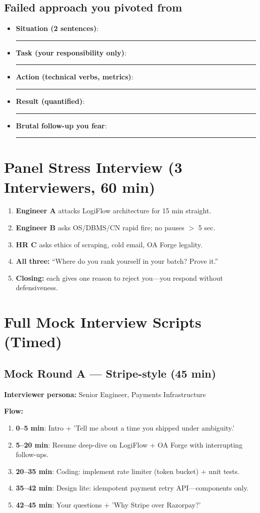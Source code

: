 \documentclass[9pt,a4paper]{article}
\begin{document}
\subsection{Failed approach you pivoted from}
\begin{itemize}
  \item \textbf{Situation (2 sentences)}: \rule{0.65\textwidth}{0.4pt}
  \item \textbf{Task (your responsibility only)}: \rule{0.65\textwidth}{0.4pt}
  \item \textbf{Action (technical verbs, metrics)}: \rule{0.65\textwidth}{0.4pt}
  \item \textbf{Result (quantified)}: \rule{0.65\textwidth}{0.4pt}
  \item \textbf{Brutal follow-up you fear}: \rule{0.65\textwidth}{0.4pt}
\end{itemize}
\section{Panel Stress Interview (3 Interviewers, 60 min)}

\begin{enumerate}
  \item \textbf{Engineer A} attacks LogiFlow architecture for 15 min straight.
  \item \textbf{Engineer B} asks OS/DBMS/CN rapid fire; no pauses $>$ 5 sec.
  \item \textbf{HR C} asks ethics of scraping, cold email, OA Forge legality.
  \item \textbf{All three:} ``Where do you rank yourself in your batch? Prove it.''
  \item \textbf{Closing:} each gives one reason to reject you---you respond without defensiveness.
\end{enumerate}
\section{Full Mock Interview Scripts (Timed)}
\subsection{Mock Round A --- Stripe-style (45 min)}
\textbf{Interviewer persona:} Senior Engineer, Payments Infrastructure

\textbf{Flow:}
\begin{enumerate}
  \item \textbf{0--5 min}: Intro + 'Tell me about a time you shipped under ambiguity.'
  \item \textbf{5--20 min}: Resume deep-dive on LogiFlow + OA Forge with interrupting follow-ups.
  \item \textbf{20--35 min}: Coding: implement rate limiter (token bucket) + unit tests.
  \item \textbf{35--42 min}: Design lite: idempotent payment retry API---components only.
  \item \textbf{42--45 min}: Your questions + 'Why Stripe over Razorpay?'
\end{enumerate}
\end{document}
